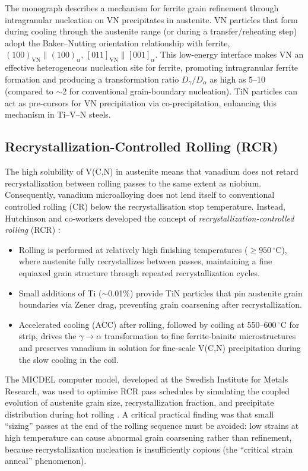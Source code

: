 \documentclass[11pt,a4paper]{article}
\begin{document}
The monograph describes a mechanism for ferrite grain refinement through
intragranular nucleation on VN precipitates in austenite.  VN particles
that form during cooling through the austenite range (or during a
transfer/reheating step) adopt the Baker--Nutting orientation
relationship with ferrite, $(100)_\text{VN}\parallel(100)_\alpha$,
$[011]_\text{VN}\parallel[001]_\alpha$.  This low-energy interface
makes VN an effective heterogeneous nucleation site for ferrite, promoting
intragranular ferrite formation and producing a transformation ratio
$D_\gamma/D_\alpha$ as high as 5--10 (compared to $\sim$2 for
conventional grain-boundary nucleation).  TiN particles can act as
pre-cursors for VN precipitation via co-precipitation, enhancing this
mechanism in Ti--V--N steels.

\subsection{Recrystallization-Controlled Rolling (RCR)}

The high solubility of V(C,N) in austenite means that vanadium does not
retard recrystallization between rolling passes to the same extent as
niobium.  Consequently, vanadium microalloying does not lend itself to
conventional controlled rolling (CR) below the recrystallisation stop
temperature.  Instead, Hutchinson and co-workers developed the concept of
\emph{recrystallization-controlled rolling} (RCR)
\cite{Zajac1991,Siwecki1995}:

\begin{itemize}
  \item Rolling is performed at relatively high finishing temperatures
    ($\geq 950\,{}^\circ$C), where austenite fully recrystallizes between
    passes, maintaining a fine equiaxed grain structure through repeated
    recrystallization cycles.
  \item Small additions of Ti ($\sim$0.01\%) provide TiN particles that
    pin austenite grain boundaries via Zener drag, preventing grain
    coarsening after recrystallization.
  \item Accelerated cooling (ACC) after rolling, followed by coiling at
    550--$600\,{}^\circ$C for strip, drives the $\gamma\to\alpha$
    transformation to fine ferrite-bainite microstructures and preserves
    vanadium in solution for fine-scale V(C,N) precipitation during the
    slow cooling in the coil.
\end{itemize}

The MICDEL computer model, developed at the Swedish Institute for Metals
Research, was used to optimise RCR pass schedules by simulating the
coupled evolution of austenite grain size, recrystallization fraction,
and precipitate distribution during hot rolling \cite{Siwecki1992}.  A
critical practical finding was that small ``sizing'' passes at the end of
the rolling sequence must be avoided: low strains at high temperature can
cause abnormal grain coarsening rather than refinement, because
recrystallization nucleation is insufficiently copious (the ``critical
strain anneal'' phenomenon).
\end{document}
